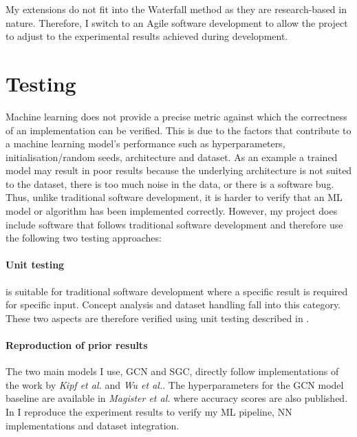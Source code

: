 My extensions do not fit into the Waterfall method as they are research-based in nature. Therefore, I switch to an Agile software development \cite{beck2001manifesto} to allow the project to adjust to the experimental results achieved during development.

\section{Testing}
\label{sec:testing}


Machine learning does not provide a precise metric against which the correctness of an implementation can be verified.
This is due to the factors that contribute to a machine learning model's performance such as hyperparameters, initialisation/random seeds, architecture and dataset.
As an example a trained model may result in poor results because the underlying architecture is not suited to the dataset, there is too much noise in the data, or there is a software bug.
Thus, unlike traditional software development, it is harder to verify that an ML model or algorithm has been implemented correctly.
However, my project does include software that follows traditional software development and therefore use the following two testing approaches:

\paragraph{Unit testing}
is suitable for traditional software development where a specific result is required for specific input.
Concept analysis and dataset handling fall into this category.
These two aspects are therefore verified using unit testing described in .

\paragraph{Reproduction of prior results}
The two main models I use, GCN and SGC, directly follow implementations of the work by \textit{Kipf et al.}\cite{kipf2016semi} and \textit{Wu et al.}\cite{wu2019simplifying}.
The hyperparameters for the GCN model baseline are available in \textit{Magister et al.}\cite{magister2021gcexplainer} where accuracy scores are also published.
In  I reproduce the experiment results to verify my ML pipeline, NN implementations and dataset integration.

